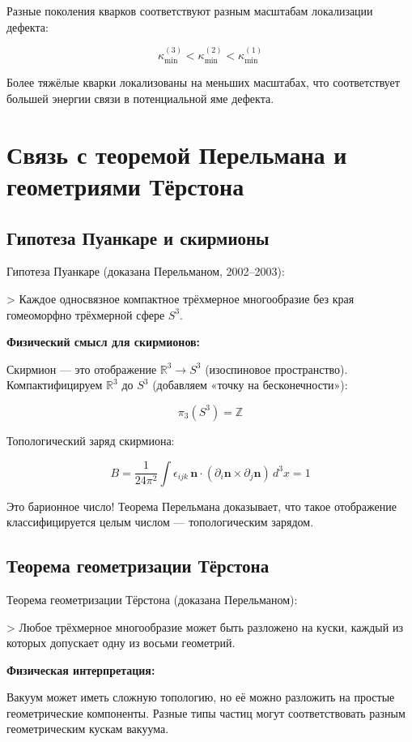 \documentclass[12pt]{article}
\begin{document}
Разные поколения кварков соответствуют разным масштабам локализации дефекта:

\[
\kappa_{\min}^{(3)} < \kappa_{\min}^{(2)} < \kappa_{\min}^{(1)}
\]

Более тяжёлые кварки локализованы на меньших масштабах, что соответствует большей энергии связи в потенциальной яме дефекта.

\section{Связь с теоремой Перельмана и геометриями Тёрстона}

\subsection{Гипотеза Пуанкаре и скирмионы}

Гипотеза Пуанкаре (доказана Перельманом, 2002–2003):

> Каждое односвязное компактное трёхмерное многообразие без края гомеоморфно трёхмерной сфере $S^3$.

\textbf{Физический смысл для скирмионов:}

Скирмион — это отображение $\mathbb{R}^3 \to S^3$ (изоспиновое пространство). Компактифицируем $\mathbb{R}^3$ до $S^3$ (добавляем «точку на бесконечности»):

\[
\pi_3(S^3) = \mathbb{Z}
\]

Топологический заряд скирмиона:

\[
B = \frac{1}{24\pi^2} \int \epsilon_{ijk} \, \mathbf{n} \cdot (\partial_i \mathbf{n} \times \partial_j \mathbf{n}) \, d^3x = 1
\]

Это барионное число! Теорема Перельмана доказывает, что такое отображение классифицируется целым числом — топологическим зарядом.

\subsection{Теорема геометризации Тёрстона}

Теорема геометризации Тёрстона (доказана Перельманом):

> Любое трёхмерное многообразие может быть разложено на куски, каждый из которых допускает одну из восьми геометрий.

\textbf{Физическая интерпретация:}

Вакуум может иметь сложную топологию, но её можно разложить на простые геометрические компоненты. Разные типы частиц могут соответствовать разным геометрическим кускам вакуума.
\end{document}
